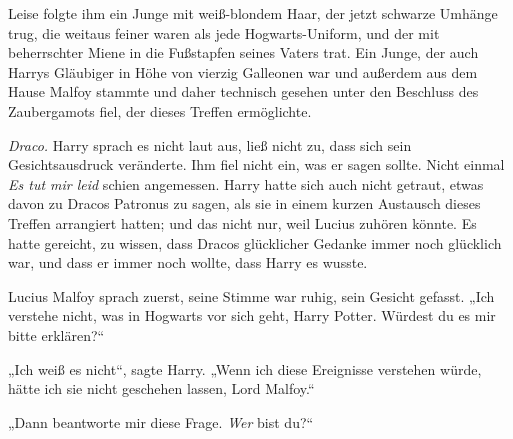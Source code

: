 Leise folgte ihm ein Junge mit weiß-blondem Haar, der jetzt schwarze Umhänge trug, die weitaus feiner waren als jede Hogwarts-Uniform, und der mit beherrschter Miene in die Fußstapfen seines Vaters trat. Ein Junge, der auch Harrys Gläubiger in Höhe von vierzig Galleonen war und außerdem aus dem Hause Malfoy stammte und daher technisch gesehen unter den Beschluss des Zaubergamots fiel, der dieses Treffen ermöglichte.

\emph{Draco.} Harry sprach es nicht laut aus, ließ nicht zu, dass sich sein Gesichtsausdruck veränderte. Ihm fiel nicht ein, was er sagen sollte. Nicht einmal \emph{Es tut mir leid} schien angemessen. Harry hatte sich auch nicht getraut, etwas davon zu Dracos Patronus zu sagen, als sie in einem kurzen Austausch dieses Treffen arrangiert hatten; und das nicht nur, weil Lucius zuhören könnte. Es hatte gereicht, zu wissen, dass Dracos glücklicher Gedanke immer noch glücklich war, und dass er immer noch wollte, dass Harry es wusste.

Lucius Malfoy sprach zuerst, seine Stimme war ruhig, sein Gesicht gefasst.
„Ich verstehe nicht, was in Hogwarts vor sich geht, Harry Potter. Würdest du es mir bitte erklären?“

„Ich weiß es nicht“, sagte Harry.
„Wenn ich diese Ereignisse verstehen würde, hätte ich sie nicht geschehen lassen, Lord Malfoy.“

„Dann beantworte mir diese Frage. \emph{Wer} bist du?“

